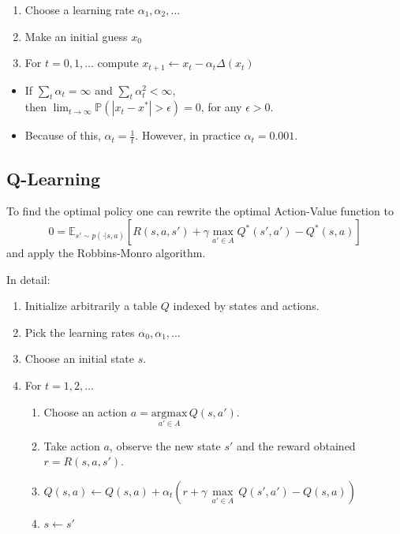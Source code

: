 \begin{enumerate}
    \item Choose a learning rate $\alpha_1, \alpha_2, \ldots$
    \item Make an initial guess $x_0$
    \item For $t={0,1,\ldots}$ compute $x_{t+1} \leftarrow x_t - \alpha_t \Delta(x_t)$
\end{enumerate}

\newpar{}
\begin{itemize}
    \item If $\sum_{t}\alpha_t = \infty$ and $\sum_{t}\alpha^2_t<\infty$, \\ then $\lim_{t\to\infty}\mathbb{P}(|x_t - x^*|>\epsilon) = 0$, for any $\epsilon > 0$.
    \item Because of this, $\alpha_t = \frac{1}{t}$. However, in practice $\alpha_t = 0.001$.
\end{itemize}

\subsection{Q-Learning}

To find the optimal policy one can rewrite the optimal Action-Value function to
\begin{equation*}
    0 = \mathbb{E}_{s'\sim p(\cdot|s,a)}\left[R(s,a,s') + \gamma \max_{a'\in A}Q^* (s',a') - Q^*(s,a)\right]
\end{equation*}
and apply the Robbins-Monro algorithm.


\newpar{}
In detail:
\begin{enumerate}
    \item Initialize arbitrarily a table $Q$ indexed by states and actions.
    \item Pick the learning rates $\alpha_0, \alpha_1, \ldots$
    \item Choose an initial state $s$.
    \item For $t = 1, 2, \ldots$
          \begin{enumerate}
              \item Choose an action $a = \underset{a'\in A}{\mathrm{argmax}}\,Q(s,a')$.
              \item Take action $a$, observe the new state $s'$ and the reward obtained $r=R(s,a,s')$.
              \item $Q(s,a) \leftarrow Q(s,a) + \alpha_t \left(r + \gamma\,\underset{a'\in A}{\max}\,Q(s',a')-Q(s,a)\right)$
              \item $s \leftarrow s'$
          \end{enumerate}
\end{enumerate}

